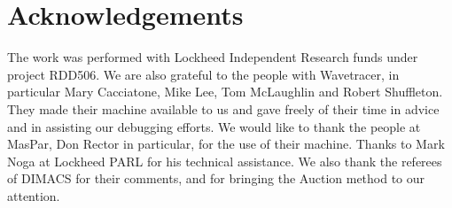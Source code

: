 \section{Acknowledgements}
\label{ack}

The work was performed with Lockheed Independent Research funds under 
project RDD506.  We are also grateful to the people 
with Wavetracer, in particular Mary Cacciatone, Mike Lee, Tom McLaughlin 
and Robert Shuffleton.  They made their machine available 
to us and gave freely of their time in advice and in assisting 
our debugging efforts.  We would like to thank the people at MasPar,
Don Rector in particular, for the use of their machine. 
Thanks to Mark Noga at Lockheed PARL for his technical assistance.
We also thank the referees of DIMACS 
for their comments, and for bringing the Auction method to our attention.


